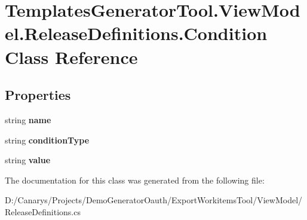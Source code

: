 \hypertarget{class_templates_generator_tool_1_1_view_model_1_1_release_definitions_1_1_condition}{}\section{Templates\+Generator\+Tool.\+View\+Model.\+Release\+Definitions.\+Condition Class Reference}
\label{class_templates_generator_tool_1_1_view_model_1_1_release_definitions_1_1_condition}
\subsection*{Properties}
\begin{DoxyCompactItemize}
\item 
\mbox{\label{class_templates_generator_tool_1_1_view_model_1_1_release_definitions_1_1_condition_a9a7b11f6643ae43e63c020d111bc5160}} 
string {\bfseries name}
\item 
\mbox{\label{class_templates_generator_tool_1_1_view_model_1_1_release_definitions_1_1_condition_a4c65941de63ce82d1eca92b5d29247df}} 
string {\bfseries condition\+Type}
\item 
\mbox{\label{class_templates_generator_tool_1_1_view_model_1_1_release_definitions_1_1_condition_acf372534f52eb8935c8cbb080e9dc57d}} 
string {\bfseries value}
\end{DoxyCompactItemize}


The documentation for this class was generated from the following file\+:\begin{DoxyCompactItemize}
\item 
D\+:/\+Canarys/\+Projects/\+Demo\+Generator\+Oauth/\+Export\+Workitems\+Tool/\+View\+Model/Release\+Definitions.\+cs\end{DoxyCompactItemize}

